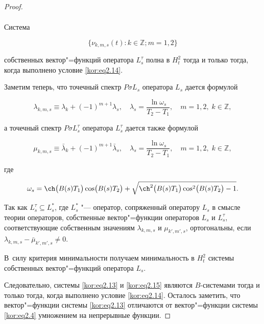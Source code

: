 \begin{proof}
\begin{gather*}
\end{gather*}

Система

\begin{equation}

\label{kor:eq2.15}

\{\nu_{k,m,s}(t):k\in\mathbb{Z};m=1,2\}

\end{equation}

собственных вектор"=функций оператора $L_s^\tau$ полна в $H_t^2$ тогда и только тогда, когда выполнено условие \eqref{kor:eq2.14}.



Заметим теперь, что точечный спектр $P\sigma L_s$ оператора $L_s$ дается формулой

$$\lambda_{k,m,s}\equiv\lambda_k+(-1)^{m+1}\lambda_s, \quad \lambda_s=\frac{\ln\omega_s}{T_2-T_1}, \quad  m=1,2,\; 

k\in\mathbb{Z}, $$

а точечный спектр $P\sigma L_s^\tau$ оператора $L_s^\tau$ дается также формулой

$$\mu_{k,m,s}\equiv\bar\lambda_k+(-1)^{m+1}\bar\lambda_s, \quad \lambda_s=\frac{\ln\omega_s}{T_2-T_1}, \quad   m=1,2,\; k\in\mathbb{Z}, $$

где 

$$

\omega_s=\ch\bigl(B(s)T_1\bigr)\cos\bigl(B(s)T_2\bigr)+\sqrt{\ch^2\bigl(B(s)T_1\bigr)\cos^2\bigl(B(s)T_2\bigr)-1}.

$$ 

Так как $L_s^\tau\subseteq L_s^*$, где $L_s^*$ "--- оператор, сопряженный оператору $L_s$ в смысле теории операторов, собственные вектор"=функции операторов $L_s$ и $L_s^\tau$, соответствующие собственным значениям $\lambda_{k,m,s}$ и $\mu_{k',m',s}$, ортогональны, если $\lambda_{k,m,s}-\bar\mu_{k',m',s}\ne0$. 

В~силу критерия минимальности \cite{kor:bib5} получаем минимальность в $H_t^2$ системы собственных вектор"=функций оператора $L_s$.



Следовательно, системы \eqref{kor:eq2.13} и \eqref{kor:eq2.15} являются $B$-системами тогда и только тогда, когда выполнено условие \eqref{kor:eq2.14}. Осталось заметить, что вектор"=функции системы \eqref{kor:eq2.13} отличаются от вектор"=функции системы \eqref{kor:eq2.4} умножением на непрерывные функции. \end{proof}



